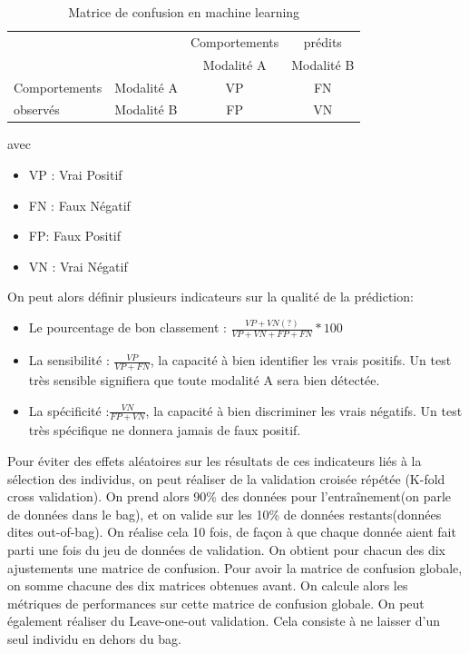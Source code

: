 \documentclass[
]{article}
\providecommand{\tightlist}{%
  \setlength{\itemsep}{0pt}\setlength{\parskip}{0pt}}
\begin{document}
\begin{table}[!h]

  \begin{tabular}{ll|cc}
  & & Comportements& prédits \\
  &&Modalité A & Modalité B\\
  \hline
  Comportements&Modalité A & VP&FN\\
  observés&Modalité B&FP&VN\\
  \hline
  \end{tabular}
  \caption{Matrice de confusion en machine learning}

\end{table}

avec

\begin{itemize}
\tightlist
\item
  VP : Vrai Positif
\item
  FN : Faux Négatif
\item
  FP: Faux Positif
\item
  VN : Vrai Négatif
\end{itemize}

On peut alors définir plusieurs indicateurs sur la qualité de la
prédiction:

\begin{itemize}
\tightlist
\item
  Le pourcentage de bon classement :
  \(\frac{VP+VN(?)}{VP+VN+FP+FN}*100\)
\item
  La sensibilité : \(\frac{VP}{VP+FN}\), la capacité à bien identifier
  les vrais positifs. Un test très sensible signifiera que toute
  modalité A sera bien détectée.
\item
  La spécificité :\(\frac{VN}{FP+VN}\), la capacité à bien discriminer
  les vrais négatifs. Un test très spécifique ne donnera jamais de faux
  positif.
\end{itemize}

Pour éviter des effets aléatoires sur les résultats de ces indicateurs
liés à la sélection des individus, on peut réaliser de la validation
croisée répétée (K-fold cross validation). On prend alors 90\% des
données pour l'entraînement(on parle de données dans le bag), et on
valide sur les 10\% de données restants(données dites out-of-bag). On
réalise cela 10 fois, de façon à que chaque donnée aient fait parti une
fois du jeu de données de validation. On obtient pour chacun des dix
ajustements une matrice de confusion. Pour avoir la matrice de confusion
globale, on somme chacune des dix matrices obtenues avant. On calcule
alors les métriques de performances sur cette matrice de confusion
globale. On peut également réaliser du Leave-one-out validation. Cela
consiste à ne laisser d'un seul individu en dehors du bag.
\end{document}
